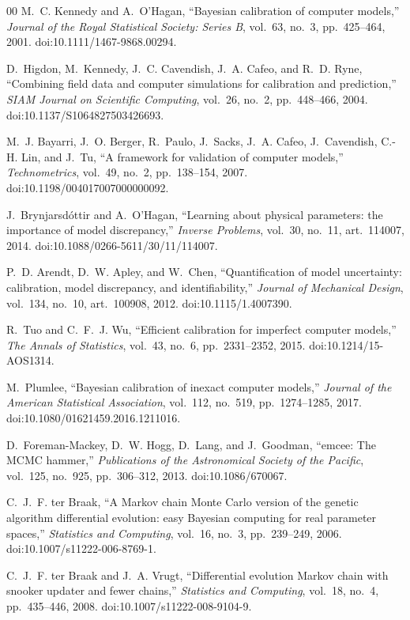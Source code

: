 \begin{thebibliography}{00}
 M.~C. Kennedy and A.~O'Hagan, ``Bayesian calibration of computer models,'' \emph{Journal of the Royal
Statistical Society: Series B}, vol.~63, no.~3, pp.~425--464, 2001. doi:10.1111/1467-9868.00294.

 D.~Higdon, M.~Kennedy, J.~C. Cavendish, J.~A. Cafeo, and R.~D. Ryne, ``Combining field data and computer
simulations for calibration and prediction,'' \emph{SIAM Journal on Scientific Computing}, vol.~26, no.~2,
pp.~448--466, 2004. doi:10.1137/S1064827503426693.

 M.~J. Bayarri, J.~O. Berger, R.~Paulo, J.~Sacks, J.~A. Cafeo, J.~Cavendish, C.-H. Lin, and J.~Tu, ``A
framework for validation of computer models,'' \emph{Technometrics}, vol.~49, no.~2, pp.~138--154, 2007.
doi:10.1198/004017007000000092.

 J.~Brynjarsd\'ottir and A.~O'Hagan, ``Learning about physical parameters: the importance of model
discrepancy,'' \emph{Inverse Problems}, vol.~30, no.~11, art.~114007, 2014. doi:10.1088/0266-5611/30/11/114007.

 P.~D. Arendt, D.~W. Apley, and W.~Chen, ``Quantification of model uncertainty: calibration, model
discrepancy, and identifiability,'' \emph{Journal of Mechanical Design}, vol.~134, no.~10, art.~100908, 2012.
doi:10.1115/1.4007390.

 R.~Tuo and C.~F.~J. Wu, ``Efficient calibration for imperfect computer models,'' \emph{The Annals of
Statistics}, vol.~43, no.~6, pp.~2331--2352, 2015. doi:10.1214/15-AOS1314.

 M.~Plumlee, ``Bayesian calibration of inexact computer models,'' \emph{Journal of the American
Statistical Association}, vol.~112, no.~519, pp.~1274--1285, 2017. doi:10.1080/01621459.2016.1211016.

 D.~Foreman-Mackey, D.~W. Hogg, D.~Lang, and J.~Goodman, ``emcee: The MCMC hammer,'' \emph{Publications of
the Astronomical Society of the Pacific}, vol.~125, no.~925, pp.~306--312, 2013. doi:10.1086/670067.

 C.~J.~F. ter Braak, ``A Markov chain Monte Carlo version of the genetic algorithm differential evolution:
easy Bayesian computing for real parameter spaces,'' \emph{Statistics and Computing}, vol.~16, no.~3, pp.~239--249, 2006.
doi:10.1007/s11222-006-8769-1.

 C.~J.~F. ter Braak and J.~A. Vrugt, ``Differential evolution Markov chain with snooker updater and fewer
chains,'' \emph{Statistics and Computing}, vol.~18, no.~4, pp.~435--446, 2008. doi:10.1007/s11222-008-9104-9.


\end{thebibliography}
